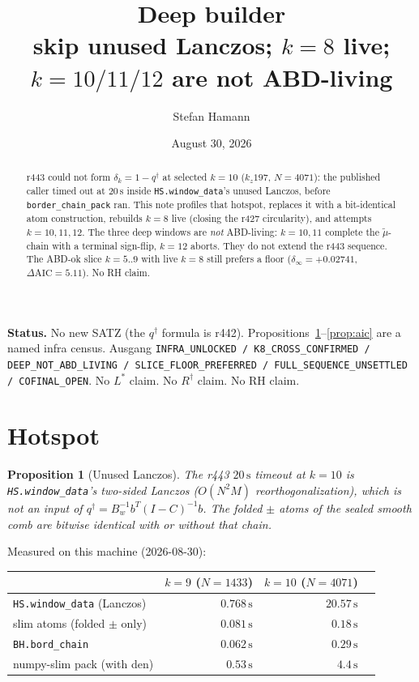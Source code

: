 \documentclass[11pt]{article}
\title{\bfseries Deep builder\\[2mm]
\large skip unused Lanczos; $k=8$ live;\\
$k=10/11/12$ are not ABD-living}
\author{Stefan Hamann}
\date{August 30, 2026}
\newtheorem{prop}{Proposition}
\newcommand{\qd}{q^{\dagger}}
\begin{document}
\maketitle

\begin{abstract}\noindent
r443 could not form $\delta_k=1-\qd$ at selected
$k=10$ ($k_z197$, $N=4071$): the published caller
timed out at $20\,\mathrm{s}$ inside
\texttt{HS.window\_data}'s unused Lanczos, before
\texttt{border\_chain\_pack} ran.
This note profiles that hotspot, replaces it with
a bit-identical atom construction, rebuilds $k=8$
live (closing the r427 circularity), and attempts
$k=10,11,12$.
The three deep windows are \emph{not} ABD-living:
$k=10,11$ complete the $\tilde\mu$-chain with a
terminal sign-flip, $k=12$ aborts.
They do not extend the r443 sequence.
The ABD-ok slice $k=5..9$ with live $k=8$ still
prefers a floor ($\delta_\infty=+0.02741$,
$\Delta\mathrm{AIC}=5.11$).
No RH claim.
\end{abstract}

\medskip\noindent
\textbf{Status.}\enspace
No new SATZ (the $\qd$ formula is r442).
Propositions~\ref{prop:hot}--\ref{prop:aic} are a
named infra census.
Ausgang
\texttt{INFRA\_UNLOCKED / K8\_CROSS\_CONFIRMED / DEEP\_NOT\_ABD\_LIVING / SLICE\_FLOOR\_PREFERRED / FULL\_SEQUENCE\_UNSETTLED / COFINAL\_OPEN}.
No $L^{*}$ claim.  No $R^{\dagger}$ claim.  No RH claim.

\section{Hotspot}\label{sec:hot}

\begin{prop}[Unused Lanczos]\label{prop:hot}
The r443 $20\,\mathrm{s}$ timeout at $k=10$ is
\texttt{HS.window\_data}'s two-sided Lanczos
($O(N^2M)$ reorthogonalization), which is not an
input of $\qd=B_w^{-1}b^{T}(I-C)^{-1}b$.
The folded $\pm$ atoms of the sealed smooth comb
are bitwise identical with or without that chain.
\end{prop}

Measured on this machine (2026-08-30):

\begin{center}
\begin{tabular}{lrrr}
\toprule
 & $k=9$ ($N=1433$) & $k=10$ ($N=4071$) \\
\midrule
\texttt{HS.window\_data} (Lanczos) & $0.768\,\mathrm{s}$ & $20.57\,\mathrm{s}$ \\
slim atoms (folded $\pm$ only) & $0.081\,\mathrm{s}$ & $0.18\,\mathrm{s}$ \\
\texttt{BH.bord\_chain} & $0.062\,\mathrm{s}$ & $0.29\,\mathrm{s}$ \\
numpy-slim pack (with den) & $0.53\,\mathrm{s}$ & $4.4\,\mathrm{s}$ \\
\bottomrule
\end{tabular}
\end{center}
\end{document}
